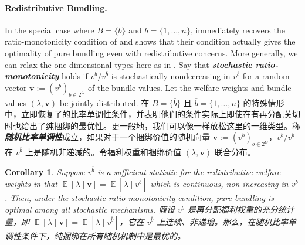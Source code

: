 \documentclass[12pt,letterpaper]{article}
\newenvironment{original}{\color{black}\noindent}{}
\newenvironment{translation}{\color{blue}\noindent}{}
\theoremstyle{plain}
\newtheorem{cor}{Corollary}
\theoremstyle{definition}
\theoremstyle{remark}
\DeclareMathOperator{\E}{\mathds{E}}
\renewcommand{\1}{\mathds{1}}
\theoremstyle{definition}
\begin{document}
\paragraph{Redistributive Bundling.}\hspace{-2mm}\begin{original}In the special case where $B = \{\overline{b}\}$ and $\overline{b} = \{1, \dots, n\}$,  immediately recovers the ratio-monotonicity condition of \citet{haghpanah2021pure} and shows that their condition actually gives the optimality of pure bundling even with redistributive concerns. More generally, we can relax the one-dimensional types here as in \citet{haghpanah2021pure}. Say that \textit{\textbf{stochastic ratio-monotonicity}} holds if $v^b/v^{\overline{b}}$ is stochastically nondecreasing in $v^{\overline{b}}$ for a random vector $\mathbf{v}:=(v^{b})_{b \in 2^{G}}$ of the bundle values. Let the welfare weights and bundle values $(\lambda, \mathbf{v})$ be jointly distributed.
\end{original}
\begin{translation}
在 $B = \{\overline{b}\}$ 且 $\overline{b} = \{1, \dots, n\}$ 的特殊情形中，立即恢复了\citet{haghpanah2021pure}的比率单调性条件，并表明他们的条件实际上即使在有再分配关切时也给出了纯捆绑的最优性。更一般地，我们可以像\citet{haghpanah2021pure}一样放松这里的一维类型。称\textit{\textbf{随机比率单调性}}成立，如果对于一个捆绑价值的随机向量 $\mathbf{v}:=(v^{b})_{b \in 2^{G}}$，$v^b/v^{\overline{b}}$ 在 $v^{\overline{b}}$ 上是随机非递减的。令福利权重和捆绑价值 $(\lambda, \mathbf{v})$ 联合分布。
\end{translation}

\begin{cor}\label{cor:pure}
\begin{original}
Suppose $v^{\overline{b}}$ is a sufficient statistic for the redistributive welfare weights in that $\E[\lambda \mid \mathbf{v}] = \E[\lambda \mid v^{\overline{b}}]$ which is continuous, non-increasing in $v^{\overline{b}}$. Then, under the stochastic ratio-monotonicity condition, pure bundling is optimal among all stochastic mechanisms.
\end{original}
\begin{translation}
假设 $v^{\overline{b}}$ 是再分配福利权重的充分统计量，即 $\E[\lambda \mid \mathbf{v}] = \E[\lambda \mid v^{\overline{b}}]$，它在 $v^{\overline{b}}$ 上连续、非递增。那么，在随机比率单调性条件下，纯捆绑在所有随机机制中是最优的。
\end{translation}
\end{cor}
\end{document}

